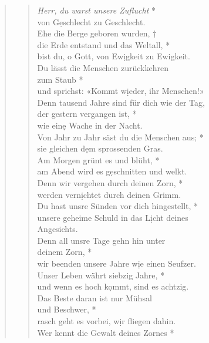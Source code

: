 \vspace{0.3cm}

\begin{quote}
 


\begin{verse}
 \textit{Herr, du warst unsere Zuflucht} *\\
von G\d eschlecht zu Geschlecht.\\
\vin Ehe die Berge geboren wurden, †\\
\vin die Erde entstand und das Weltall, *\\ \vin bist du, o Gott, von Ew\d igkeit zu Ewigkeit.\\
Du lässt die Menschen zurückkehren \\  zum Staub *\\
und sprichst: «Kommt w\d ieder, ihr Menschen!» \\
\vin Denn tausend Jahre sind für dich 
wie der Tag, \\ \vin der gestern vergangen ist, *\\ \vin wie ein\d e Wache in der Nacht.\\ 
Von Jahr zu Jahr säst du die Menschen aus; *\\
sie gleichen d\d em sprossenden Gras.\\
\vin Am Morgen grünt es und blüht, *\\
\vin am Abend wird es g\d eschnitten und welkt.\\
Denn wir vergehen durch deinen Zorn, *\\
werden vern\d ichtet durch deinen Grimm.\\
\vin Du hast unsre Sünden vor dich hingestellt, *\\
\vin unsere geheime Schuld in das L\d icht deines \\ \vin  Angesichts.\\ 
Denn all unsre Tage gehn hin unter \\ deinem Zorn, *\\
wir beenden unsere Jahre w\d ie einen Seufzer.\\ 
\vin Unser Leben währt siebzig Jahre, *\\
\vin und wenn es hoch k\d ommt, sind es achtzig.\\ 
Das Beste daran ist nur Mühsal\\ und Beschwer, *\\ rasch geht es vorbei, w\d ir fliegen dahin.\\ 
\vin Wer kennt die Gewalt deines Zornes *\\

\end{verse}
\end{quote}
